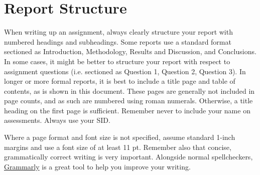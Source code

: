 \section{Report Structure}
When writing up an assignment, always clearly structure your report with numbered headings and subheadings. Some reports use a standard format sectioned as Introduction, Methodology,  Results and Discussion, and Conclusions. In some cases, it might be better to structure your report with respect to assignment questions (i.e. sectioned as Question 1, Question 2, Question 3). In longer or more formal reports, it is best to include a title page and table of contents, as is shown in this document. These pages are generally not included in page counts, and as such are numbered using roman numerals. Otherwise, a title heading on the first page is sufficient. Remember never to include your name on assessments. Always use your SID.

Where a page format and font size is not specified, assume standard 1-inch margins and use a font size of at least 11 pt. Remember also that concise, grammatically correct writing is very important. Alongside normal spellcheckers, \href{https://app.grammarly.com/}{Grammarly} is a great tool to help you improve your writing.